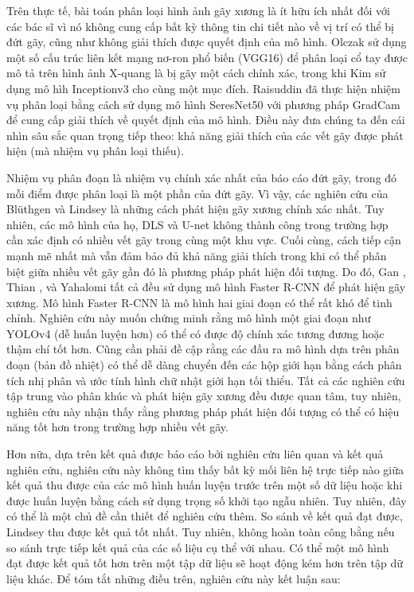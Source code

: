 \documentclass[../the.tex]{subfiles}
\begin{document}
{\fontsize{13}{12} \selectfont
Trên thực tế, bài toán phân loại hình ảnh gãy xương là ít hữu ích nhất đối với các bác sĩ vì nó không cung cấp bất kỳ thông tin chi tiết nào về vị trí có thể bị đứt gãy, cũng như không giải thích được quyết định của mô hình. Olczak \etal \cite{Olczak2017} sử dụng một số cấu trúc liên kết mạng nơ-ron phổ biến (VGG16) để phân loại cổ tay được mô tả trên hình ảnh X-quang là bị gãy một cách chính xác, trong khi Kim \etal \cite{Kim2018} sử dụng mô hìh Inceptionv3 cho cùng một mục đích. Raisuddin \etal \cite{Raisuddin2021} đã thực hiện nhiệm vụ phân loại bằng cách sử dụng mô hình SeresNet50 với phương pháp GradCam để cung cấp giải thích về quyết định của mô hình. Điều này đưa chúng ta đến cái nhìn sâu sắc quan trọng tiếp theo: khả năng giải thích của các vết gãy được phát hiện (mà nhiệm vụ phân loại thiếu). 

Nhiệm vụ phân đoạn là nhiệm vụ chính xác nhất của báo cáo đứt gãy, trong đó mỗi điểm được phân loại là một phần của đứt gãy. Vì vậy, các nghiên cứu của Bl\"{u}thgen \etal \cite{Blthgen2020} và Lindsey \etal \cite{Lindsey1806905115} là những cách phát hiện gãy xương chính xác nhất. Tuy nhiên, các mô hình của họ, DLS và U-net không thành công trong trường hợp cần xác định có nhiều vết gãy trong cùng một khu vực. Cuối cùng, cách tiếp cận mạnh mẽ nhất mà vẫn đảm bảo đủ khả năng giải thích trong khi có thể phân biệt giữa nhiều vết gãy gần đó là phương pháp phát hiện đối tượng. Do đó, Gan \etal \cite{Gan2019}, Thian \etal \cite{Thian2019}, và Yahalomi \etal \cite{Yahalomi2019DetectionOD} tất cả đều sử dụng mô hình Faster R-CNN để phát hiện gãy xương. Mô hình Faster R-CNN là mô hình hai giai đoạn có thể rất khó để tinh chỉnh. Nghiên cứu này muốn chứng minh rằng mô hình một giai đoạn như YOLOv4 (dễ huấn luyện hơn) có thể có được độ chính xác tương đương hoặc thậm chí tốt hơn. Cũng cần phải đề cập rằng các đầu ra mô hình dựa trên phân đoạn (bản đồ nhiệt) có thể dễ dàng chuyển đến các hộp giới hạn bằng cách phân tích nhị phân và ước tính hình chữ nhật giới hạn tối thiểu. Tất cả các nghiên cứu tập trung vào phân khúc và phát hiện gãy xương đều được quan tâm, tuy nhiên, nghiên cứu này nhận thấy rằng phương pháp phát hiện đối tượng có thể có hiệu năng tốt hơn trong trường hợp nhiều vết gãy. 

Hơn nữa, dựa trên kết quả được báo cáo bởi nghiên cứu liên quan và kết quả nghiên cứu, nghiên cứu này không tìm thấy bất kỳ mối liên hệ trực tiếp nào giữa kết quả thu được của các mô hình huấn luyện trước trên một số dữ liệu hoặc khi được huấn luyện bằng cách sử dụng trọng số khởi tạo ngẫu nhiên. Tuy nhiên, đây có thể là một chủ đề cần thiết để nghiên cứu thêm. So sánh về kết quả đạt được, Lindsey\etal \cite{Lindsey1806905115} thu được kết quả tốt nhất. Tuy nhiên, không hoàn toàn công bằng nếu so sánh trực tiếp kết quả của các số liệu cụ thể với nhau. Có thể một mô hình đạt được kết quả tốt hơn trên một tập dữ liệu sẽ hoạt động kém hơn trên tập dữ liệu khác. Để tóm tắt những điều trên, nghiên cứu này kết luận sau:

}
\end{document}

